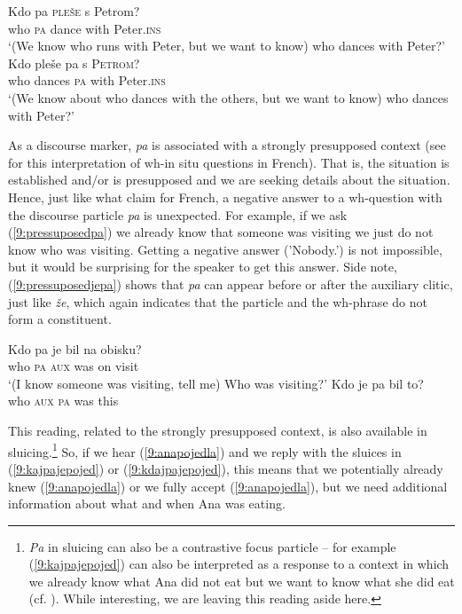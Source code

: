 \documentclass[output=paper,modfonts,newtxmath,hidelinks]{langscibook}
\begin{document}
\begin{exe}
\ex  \label{9:topicfocuspa}
\begin{xlist}
\ex \gll	Kdo pa \textsc{pleše} s Petrom?\\
		who \textsc{pa} dance with Peter.\textsc{ins}\\
\trans `(We know who runs with Peter, but we want to know) who dances with Peter?'
\ex \gll	Kdo pleše pa s \textsc{Petrom}?\\
		who dances \textsc{pa} with Peter.\textsc{ins}\\
\trans `(We know about who dances with the others, but we want to know) who dances with Peter?'
\end{xlist}
\end{exe}

\noindent As a discourse marker, \textit{pa} is associated with a strongly presupposed context (see \citealt{chengrooryck2000} for this interpretation of wh-in situ questions in French). That is, the situation is established and/or is presupposed and we are seeking details about the situation. Hence, just like what \cite{chengrooryck2000} claim for French, a negative answer to a wh-question with the discourse particle \textit{pa} is unexpected. For example, if we ask (\ref{9:pressuposedpa}) we already know that someone was visiting we just do not know who was visiting. Getting a negative answer ('Nobody.') is not impossible, but it would be surprising for the speaker to get this answer. Side note, (\ref{9:pressuposedjepa}) shows that \textit{pa} can appear before or after the auxiliary clitic, just like \textit{že}, which again indicates that the particle and the wh-phrase do not form a constituent. 

\begin{exe}
\ex \begin{xlist}
\ex \label{9:pressuposedpa}
\gll Kdo pa je bil na obisku?\\
	who \textsc{pa} \textsc{aux} was on visit\\
\trans `(I know someone was visiting, tell me) Who was visiting?'
\ex \label{9:pressuposedjepa} 
\gll Kdo je pa bil to?\\
who  \textsc{aux}  \textsc{pa} was this\\
\end{xlist}
\end{exe}

\noindent This reading, related to the strongly presupposed context, is also available in sluicing.\footnote{\textit{Pa} in sluicing can also be a contrastive focus particle -- for example (\ref{9:kajpajepojed}) can also be interpreted as a response to a context in which we already know what Ana did not eat but we want to know what she did eat (cf. \citealt{marusicetal2015}). While interesting, we are leaving this reading aside here.} So, if we hear (\ref{9:anapojedla}) and we reply with the sluices in (\ref{9:kajpajepojed}) or (\ref{9:kdajpajepojed}), this means that we potentially already knew (\ref{9:anapojedla}) or we fully accept (\ref{9:anapojedla}), but we need additional information about what and when Ana was eating. 
\end{document}
